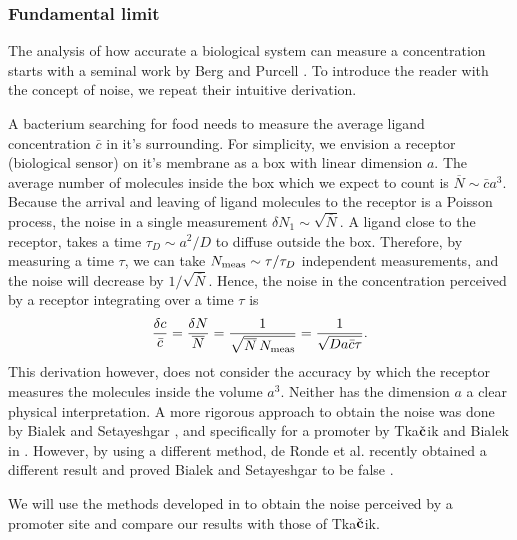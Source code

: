 \subsubsection{Fundamental limit}
The analysis of how accurate a biological system can measure a concentration starts with a seminal work by Berg and Purcell \cite{Berg1977}. To introduce the reader with the concept of noise, we repeat their intuitive derivation. 

A bacterium searching for food needs to measure the average ligand concentration $\bar{c}$ in it's surrounding. For simplicity, we envision a receptor (biological sensor) on it's membrane as a box with linear dimension $a$. The average number of molecules inside the box which we expect to count is $\overline{N} \sim \bar{c} a^3$. Because the arrival and leaving of ligand molecules to the receptor is a Poisson process, the noise in a single measurement $\delta N_1 \sim \sqrt{\overline{N}}$. A ligand close to the receptor, takes a time $\tau_D \sim a^2/D$ to diffuse outside the box. Therefore, by measuring a time $\tau$, we can take $N_{\rm meas} \sim \tau/\tau_D$ independent measurements, and the noise will decrease by $1/\sqrt{\overline{N}}$. Hence, the noise in the concentration perceived by a receptor integrating over a time $\tau$ is
\begin{equation}
 \frac{\delta c}{\bar{c}} = \frac{\delta N}{\overline{N}} = \frac{1}{\sqrt{\overline{N}\,N_{\rm meas}}} = \frac{1}{\sqrt{D a \bar{c} \tau}}.
\end{equation}
This derivation however, does not consider the accuracy by which the receptor measures the molecules inside the volume $a^3$. Neither has the dimension $a$ a clear physical interpretation. A more rigorous approach to obtain the noise was done by Bialek and Setayeshgar \cite{Bialek2005}, and specifically for a promoter by Tka$\check{\bf c}$ik and Bialek in \cite{Tkacik2009}. However, by using a different method, de Ronde et al. recently obtained a different result and proved Bialek and Setayeshgar to be false \cite{DeRonde2012}.

We will use the methods developed in \cite{DeRonde2012} to obtain the noise perceived by a promoter site and compare our results with those of Tka$\check{\bf c}$ik.

